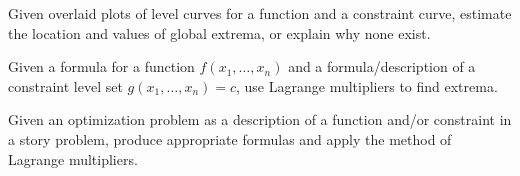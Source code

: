 \documentclass[11pt, oneside]{article}
\newcounter{objective}
\begin{document}
\begin{objectives}
		\item Given overlaid plots of level curves for a function and a constraint curve, estimate the location
			and values of global extrema, or explain why none exist.

		\item
		\begin{subobjectives}
			\item Given a formula for a function $f(x_1,\ldots,x_n)$ and a formula/description of a constraint 
				level set $g(x_1,\ldots,x_n)=c$, use Lagrange multipliers to find extrema.
			\item Given an optimization problem as a description of a function and/or constraint in a story problem, 
				produce appropriate formulas and apply the method of Lagrange multipliers.
		\end{subobjectives}
	\end{objectives}
\end{document}
